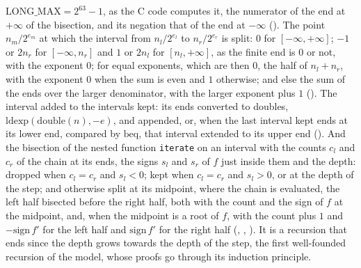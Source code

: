 \begin{definition}\label{def:iterate}
  \leanok
  $\mathrm{LONG\_MAX} = 2^{63} - 1$, as the C code computes it, the numerator of the end at
  $+\infty$ of the bisection, and its negation that of the end at $-\infty$
  (). The point $n_m/2^{e_m}$ at which the interval from $n_l/2^{e_l}$ to
  $n_r/2^{e_r}$ is split: $0$ for $[-\infty, +\infty]$; $-1$ or $2 n_r$ for $[-\infty, n_r]$ and $1$
  or $2 n_l$ for $[n_l, +\infty]$, as the finite end is $0$ or not, with the exponent $0$; for equal
  exponents, which are then $0$, the half of $n_l + n_r$, with the exponent $0$ when the sum is even
  and $1$ otherwise; and else the sum of the ends over the larger denominator, with the larger
  exponent plus $1$ (). The interval added to the intervals kept: its
  ends converted to doubles, $\mathrm{ldexp}(\mathrm{double}(n), -e)$, and appended, or, when the
  last interval kept ends at its lower end, compared by $\mathrm{beq}$, that interval extended to
  its upper end (). And the bisection of the nested function
  \verb|iterate| on an interval with the counts $c_l$ and $c_r$ of the chain at its ends, the signs
  $s_l$ and $s_r$ of $f$ just inside them and the depth: dropped when $c_l = c_r$ and $s_l < 0$;
  kept when $c_l = c_r$ and $s_l > 0$, or at the depth of the step; and otherwise split at its
  midpoint, where the chain is evaluated, the left half bisected before the right half, both with
  the count and the sign of $f$ at the midpoint, and, when the midpoint is a root of $f$, with the
  count plus $1$ and $-\mathrm{sign}\, f'$ for the left half and $\mathrm{sign}\, f'$ for the right
  half (, , ). It
  is a recursion that ends since the depth grows towards the depth of the step, the first
  well-founded recursion of the model, whose proofs go through its induction principle.
\end{definition}

